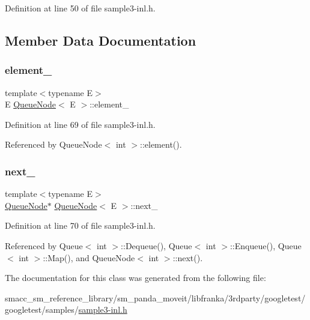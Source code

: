 Definition at line 50 of file sample3-\/inl.\+h.



\subsection{Member Data Documentation}
\mbox{\label{classQueueNode_a593f0f5862848c1e9063d32ea3438b58}} 
\subsubsection{\texorpdfstring{element\+\_\+}{element\_}}
{\footnotesize\ttfamily template$<$typename E$>$ \\
E \hyperlink{classQueueNode}{Queue\+Node}$<$ E $>$\+::element\+\_\+\hspace{0.3cm}{\ttfamily [private]}}



Definition at line 69 of file sample3-\/inl.\+h.



Referenced by Queue\+Node$<$ int $>$\+::element().

\mbox{\label{classQueueNode_a7434603f6c25418f7810f041752876bd}} 
\subsubsection{\texorpdfstring{next\+\_\+}{next\_}}
{\footnotesize\ttfamily template$<$typename E$>$ \\
\hyperlink{classQueueNode}{Queue\+Node}$\ast$ \hyperlink{classQueueNode}{Queue\+Node}$<$ E $>$\+::next\+\_\+\hspace{0.3cm}{\ttfamily [private]}}



Definition at line 70 of file sample3-\/inl.\+h.



Referenced by Queue$<$ int $>$\+::\+Dequeue(), Queue$<$ int $>$\+::\+Enqueue(), Queue$<$ int $>$\+::\+Map(), and Queue\+Node$<$ int $>$\+::next().



The documentation for this class was generated from the following file\+:\begin{DoxyCompactItemize}
\item 
smacc\+\_\+sm\+\_\+reference\+\_\+library/sm\+\_\+panda\+\_\+moveit/libfranka/3rdparty/googletest/googletest/samples/\hyperlink{sample3-inl_8h}{sample3-\/inl.\+h}\end{DoxyCompactItemize}

